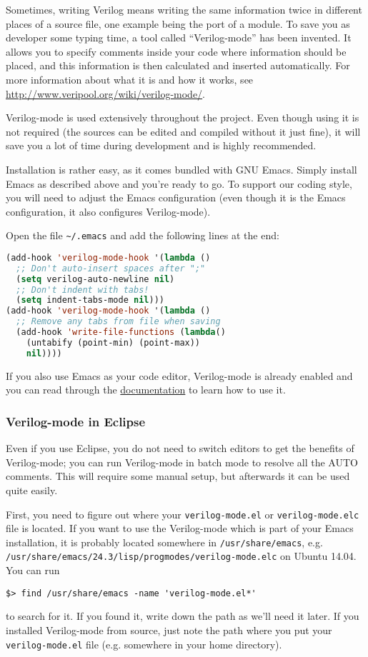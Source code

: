 Sometimes, writing Verilog means writing the same information twice in
different places of a source file, one example being the port of a module. To
save you as developer some typing time, a tool called ``Verilog-mode'' has been
invented. It allows you to specify comments inside your code where information
should be placed, and this information is then calculated and inserted
automatically. For more information about what it is and how it works, see
\url{http://www.veripool.org/wiki/verilog-mode/}.

Verilog-mode is used extensively throughout the project. Even though using it
is not required (the sources can be edited and compiled without it just fine),
it will save you a lot of time during development and is highly recommended.

Installation is rather easy, as it comes bundled with GNU Emacs. Simply install
Emacs as described above and you're ready to go. To support our coding style,
you will need to adjust the Emacs configuration (even though it is the Emacs
configuration, it also configures Verilog-mode).

Open the file \verb|~/.emacs| and add the following lines at the end:
\begin{lstlisting}[language=Lisp]
(add-hook 'verilog-mode-hook '(lambda ()
  ;; Don't auto-insert spaces after ";"
  (setq verilog-auto-newline nil)
  ;; Don't indent with tabs!
  (setq indent-tabs-mode nil)))
(add-hook 'verilog-mode-hook '(lambda ()
  ;; Remove any tabs from file when saving
  (add-hook 'write-file-functions (lambda()
    (untabify (point-min) (point-max))
    nil))))
\end{lstlisting}


If you also use Emacs as your code editor,
Verilog-mode is already enabled and you can read through the
\href{http://www.veripool.org/wiki/verilog-mode/Documentation}{documentation} to
learn how to use it.

\subsubsection{Verilog-mode in Eclipse}

Even if you use Eclipse, you do not need to switch editors to get the
benefits of Verilog-mode; you can run Verilog-mode in batch mode to
resolve all the AUTO comments. This will require some manual setup, but
afterwards it can be used quite easily.

First, you need to figure out where your \verb|verilog-mode.el| or
\verb|verilog-mode.elc| file is located. If you want to use the
Verilog-mode which is part of your Emacs installation, it is probably located
somewhere in \verb|/usr/share/emacs|, e.g.
\verb|/usr/share/emacs/24.3/lisp/progmodes/verilog-mode.elc| on Ubuntu 14.04.
You can run
\begin{lstlisting}
$> find /usr/share/emacs -name 'verilog-mode.el*'
\end{lstlisting}
to search for it. If you found it, write down the path as we'll need it later.
If you installed Verilog-mode from source, just note the path where you put
your \verb|verilog-mode.el| file (e.g. somewhere in your home directory).

